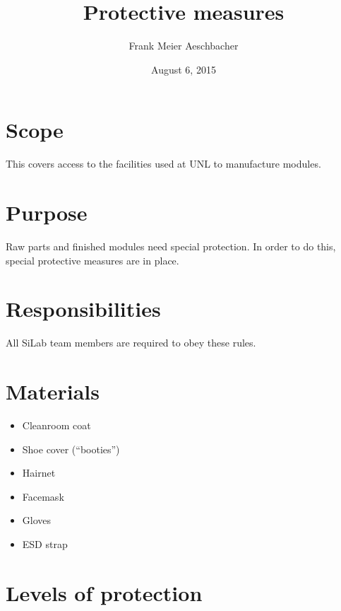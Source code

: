 \documentclass[12pt]{unlsilabsop}
\title{Protective measures}
\date{August 6, 2015}
\author{Frank Meier Aeschbacher}
\begin{document}
\maketitle

\section{Scope}
This covers access to the facilities used at UNL to manufacture modules.

\section{Purpose}
Raw parts and finished modules need special protection. In order to do this, special protective measures are in place.


\section{Responsibilities}
All SiLab team members are required to obey these rules.

\section{Materials}
\begin{itemize}
    \item Cleanroom coat
    \item Shoe cover (``booties'')
    \item Hairnet
    \item Facemask
    \item Gloves
    \item ESD strap
\end{itemize}

\section{Levels of protection}
\end{document}
